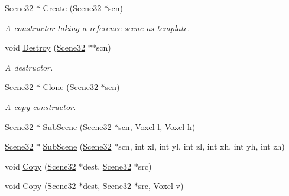 \begin{DoxyCompactItemize}
\hyperlink{namespacegft_1_1Scene32_ae492ac529c9149889605a7bebd647c46}{Scene32} $\ast$ \hyperlink{namespacegft_1_1Scene32_a7fe14573de0e82544f799c67386071e0}{Create} (\hyperlink{namespacegft_1_1Scene32_ae492ac529c9149889605a7bebd647c46}{Scene32} $\ast$scn)
\begin{DoxyCompactList}\small\item\em A constructor taking a reference scene as template. \end{DoxyCompactList}\item 
void \hyperlink{namespacegft_1_1Scene32_ac2981ab08e433d5b115b47814a407c5e}{Destroy} (\hyperlink{namespacegft_1_1Scene32_ae492ac529c9149889605a7bebd647c46}{Scene32} $\ast$$\ast$scn)
\begin{DoxyCompactList}\small\item\em A destructor. \end{DoxyCompactList}\item 
\hyperlink{namespacegft_1_1Scene32_ae492ac529c9149889605a7bebd647c46}{Scene32} $\ast$ \hyperlink{namespacegft_1_1Scene32_aeb1c221c798ad626f2b00617a1075d88}{Clone} (\hyperlink{namespacegft_1_1Scene32_ae492ac529c9149889605a7bebd647c46}{Scene32} $\ast$scn)
\begin{DoxyCompactList}\small\item\em A copy constructor. \end{DoxyCompactList}\item 
\hyperlink{namespacegft_1_1Scene32_ae492ac529c9149889605a7bebd647c46}{Scene32} $\ast$ \hyperlink{namespacegft_1_1Scene32_ad1f1803253126b2a4ccfe0490de71a8b}{Sub\-Scene} (\hyperlink{namespacegft_1_1Scene32_ae492ac529c9149889605a7bebd647c46}{Scene32} $\ast$scn, \hyperlink{namespacegft_a16db894075bb714f877a3c5733772db6}{Voxel} l, \hyperlink{namespacegft_a16db894075bb714f877a3c5733772db6}{Voxel} h)
\item 
\hyperlink{namespacegft_1_1Scene32_ae492ac529c9149889605a7bebd647c46}{Scene32} $\ast$ \hyperlink{namespacegft_1_1Scene32_a1ad4156074f32a49f535e605e0c5fac2}{Sub\-Scene} (\hyperlink{namespacegft_1_1Scene32_ae492ac529c9149889605a7bebd647c46}{Scene32} $\ast$scn, int xl, int yl, int zl, int xh, int yh, int zh)
\item 
void \hyperlink{namespacegft_1_1Scene32_ab2f59dd2231ae82cdebc6dfe571e8f1d}{Copy} (\hyperlink{namespacegft_1_1Scene32_ae492ac529c9149889605a7bebd647c46}{Scene32} $\ast$dest, \hyperlink{namespacegft_1_1Scene32_ae492ac529c9149889605a7bebd647c46}{Scene32} $\ast$src)
\item 
void \hyperlink{namespacegft_1_1Scene32_a331a6e7fad80ba2af66ce45c06e938c8}{Copy} (\hyperlink{namespacegft_1_1Scene32_ae492ac529c9149889605a7bebd647c46}{Scene32} $\ast$dest, \hyperlink{namespacegft_1_1Scene32_ae492ac529c9149889605a7bebd647c46}{Scene32} $\ast$src, \hyperlink{namespacegft_a16db894075bb714f877a3c5733772db6}{Voxel} v)
$$
\end{DoxyCompactItemize}
